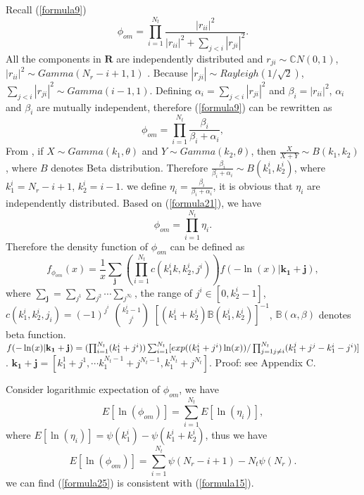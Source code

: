 \documentclass[12pt, draftclsnofoot, onecolumn]{IEEEtran}
\begin{document}
Recall (\ref{formula9})
\begin{equation}
\phi_{om}=\prod_{i=1}^{N_{t}}\frac{|r_{ii}|^{2}}{|r_{ii}|^{2}+\sum_{j<i}|r_{ji}|^{2}}.
\end{equation}
All the components in $\mathbf{R}$ are independently distributed and $r_{ji}\sim \mathbb{C}N(0,1)$, $|r_{ii}|^{2}\sim Gamma(N_{r}-i+1,1)$ \cite{nagar2011expectations}. Because $|r_{ji}|\sim Rayleigh(1/\sqrt{2})$, $\sum_{j<i}|r_{ji}|^{2}\sim Gamma(i-1, 1)$. Defining $\alpha_{i}=\sum_{j<i}|r_{ji}|^{2}$ and $\beta_{i}=|r_{ii}|^{2}$, $\alpha_{i}$ and $\beta_{i}$ are mutually independent, therefore (\ref{formula9}) can be rewritten as 
\begin{equation}
\phi_{om}=\prod_{i=1}^{N_{t}}\frac{\beta_{i}}{\beta_{i}+\alpha_{i}},
\label{formula21}
\end{equation}
From \cite{gupta2004handbook}, if $X\sim Gamma(k_{1},\theta)$ and $Y\sim Gamma(k_{2},\theta)$, then $\frac{X}{X+Y}\sim B(k_{1},k_{2})$, where $B$ denotes Beta distribution. Therefore $\frac{\beta_{i}}{\beta_{i}+\alpha_{i}}\sim B(k^{i}_{1}, k^{i}_{2})$, where $k^{i}_{1}=N_{r}-i+1$, $k^{i}_{2}=i-1$. we define $\eta_{i}=\frac{\beta_{i}}{\beta_{i}+\alpha_{i}}$, it is obvious that $\eta_{i}$ are independently distributed. Based on (\ref{formula21}), we have 
\begin{equation}
\phi_{om}=\prod_{i=1}^{N_{t}}\eta_{i}.
\label{formula22}
\end{equation}
Therefore the density function of $\phi_{om}$ can be defined as
\begin{equation}
f_{\phi_{om}}(x)=\frac{1}{x}\sum_{\mathbf{j}}(\prod_{i=1}^{N_{t}}c(k_{1}^{i}k,k_{2}^{i},j^{i}))f(-\ln(x)|\mathbf{k_{1}}+\mathbf{j}), 
\label{formula23}
\end{equation}
where $\sum_{\mathbf{j}}=\sum_{j^{1}}\sum_{j^{2}}\cdots \sum_{j^{N_{t}}}$, the range of $j^{i}\in [0, k_{2}^{i}-1]$, $c(k_{1}^{i}, k_{2}^{i}, j_{i})=(-1)^{j^{i}}$ $k_{2}^{i}-1\choose j^{i}$ $[(k_{1}^{i}+k_{2}^{i})\mathbb{B}(k_{1}^{i},k_{2}^{i})]^{-1}$, $\mathbb{B}(\alpha, \beta)$ denotes beta function. $f(-\ln(x)|\mathbf{k_{1}}+\mathbf{j})=(\prod_{i=1}^{N_{t}}(k_{1}^{i}+j^{i}))\sum_{i=1}^{N_{t}}[exp((k_{1}^{i}+j^{i})\ln(x))/\prod_{j=1\\ j\neq i}^{N_{t}}(k_{1}^{j}+j^{j}-k_{1}^{i}-j^{i})]$. $\mathbf{k_{1}}+\mathbf{j}=[k_{1}^{1}+j^{1},\cdots k_{1}^{N_{t}-1}+j^{N_{t}-1},k_{1}^{N_{t}}+j^{N_{t}}]$. Proof: see Appendix C. 

Consider logarithmic expectation of $\phi_{om}$, we have
\begin{equation}
E[\ln(\phi_{om})]=\sum_{i=1}^{N_{t}}E[\ln(\eta_{i})],
\label{formula24}
\end{equation}
where $E[\ln(\eta_{i})]=\psi(k^{i}_{1})-\psi(k^{i}_{1}+k^{i}_{2})$, thus we have 
\begin{equation}
E[\ln(\phi_{om})]=\sum_{i=1}^{N_{t}}\psi(N_{r}-i+1)-N_{t}\psi(N_{r}).
\label{formula25}
\end{equation}
we can find (\ref{formula25}) is consistent with (\ref{formula15}). 
\end{document}
